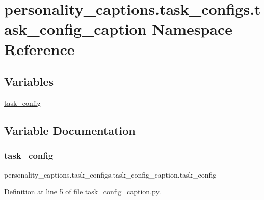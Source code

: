 \hypertarget{namespacepersonality__captions_1_1task__configs_1_1task__config__caption}{}\section{personality\+\_\+captions.\+task\+\_\+configs.\+task\+\_\+config\+\_\+caption Namespace Reference}
\label{namespacepersonality__captions_1_1task__configs_1_1task__config__caption}
\subsection*{Variables}
\begin{DoxyCompactItemize}
\item 
\hyperlink{namespacepersonality__captions_1_1task__configs_1_1task__config__caption_a2dafc15d5a88c07cd526aac6dcf698c9}{task\+\_\+config}
\end{DoxyCompactItemize}


\subsection{Variable Documentation}
\mbox{\label{namespacepersonality__captions_1_1task__configs_1_1task__config__caption_a2dafc15d5a88c07cd526aac6dcf698c9}} 
\subsubsection{\texorpdfstring{task\+\_\+config}{task\_config}}
{\footnotesize\ttfamily personality\+\_\+captions.\+task\+\_\+configs.\+task\+\_\+config\+\_\+caption.\+task\+\_\+config}



Definition at line 5 of file task\+\_\+config\+\_\+caption.\+py.

